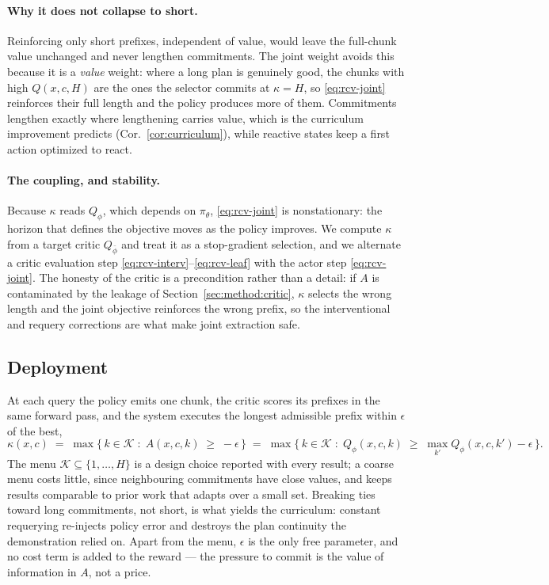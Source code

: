 \paragraph{Why it does not collapse to short.}
Reinforcing only short prefixes, independent of value, would leave the full-chunk value unchanged and
never lengthen commitments. The joint weight avoids this because it is a \emph{value} weight: where a
long plan is genuinely good, the chunks with high $Q(x,c,H)$ are the ones the selector commits at
$\kappa=H$, so \eqref{eq:rcv-joint} reinforces their full length and the policy produces more of them.
Commitments lengthen exactly where lengthening carries value, which is the curriculum improvement
predicts (Cor.~\ref{cor:curriculum}), while reactive states keep a first action optimized to react.

\paragraph{The coupling, and stability.}
Because $\kappa$ reads $Q_\phi$, which depends on $\pi_\theta$, \eqref{eq:rcv-joint} is nonstationary:
the horizon that defines the objective moves as the policy improves. We compute $\kappa$ from a target
critic $Q_{\bar\phi}$ and treat it as a stop-gradient selection, and we alternate a critic evaluation
step \eqref{eq:rcv-interv}--\eqref{eq:rcv-leaf} with the actor step \eqref{eq:rcv-joint}. The honesty of
the critic is a precondition rather than a detail: if $A$ is contaminated by the leakage of
Section~\ref{sec:method:critic}, $\kappa$ selects the wrong length and the joint objective reinforces
the wrong prefix, so the interventional and requery corrections are what make joint extraction safe.

\subsection{Deployment}
\label{sec:method:deploy}

At each query the policy emits one chunk, the critic scores its prefixes in the same forward pass, and
the system executes the longest admissible prefix within $\epsilon$ of the best,
\begin{equation}
\label{eq:rcv-kappa}
\kappa(x, c) \;=\; \max\Big\{\,k \in \mathcal K \;:\; A(x,c,k) \;\ge\; -\epsilon \,\Big\}
\;=\; \max\Big\{\,k \in \mathcal K \;:\; Q_\phi(x, c, k) \;\ge\;
\max_{k'} Q_\phi(x, c, k') - \epsilon \,\Big\}.
\end{equation}
The menu $\mathcal K\subseteq\{1,\dots,H\}$ is a design choice reported with every result; a coarse
menu costs little, since neighbouring commitments have close values, and keeps results comparable to
prior work that adapts over a small set. Breaking ties toward long commitments, not short, is what
yields the curriculum: constant requerying re-injects policy error and destroys the plan continuity
the demonstration relied on. Apart from the menu, $\epsilon$ is the only free parameter, and no cost
term is added to the reward --- the pressure to commit is the value of information in $A$, not a price.

